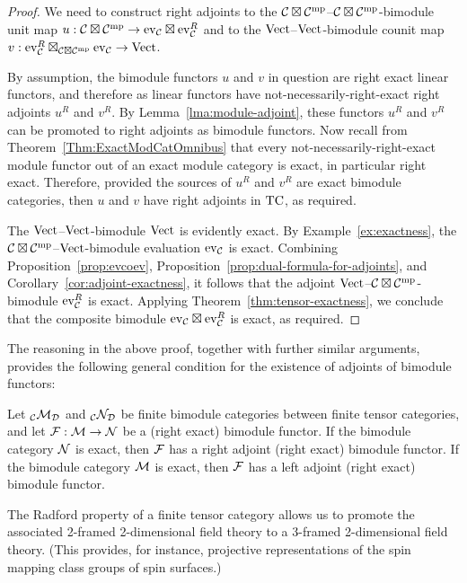 \documentclass{amsart}
\begin{document}
\begin{proof}
We need to construct right adjoints to the $\mathcal C \boxtimes \mathcal C^{\mathrm{mp}}$--$\mathcal C \boxtimes \mathcal C^{\mathrm{mp}}$-bimodule unit map $u: \mathcal C \boxtimes \mathcal C^{\mathrm{mp}} \rightarrow \mathrm{ev}_\mathcal C \boxtimes \mathrm{ev}_\mathcal C^R$ and to the $\mathrm{Vect}$--$\mathrm{Vect}$-bimodule counit map $v: \mathrm{ev}_\mathcal C^R \boxtimes_{\mathcal C \boxtimes \mathcal C^{\mathrm{mp}}} \mathrm{ev}_\mathcal C \rightarrow \mathrm{Vect}$.

By assumption, the bimodule functors $u$ and $v$ in question are right exact linear functors, and therefore as linear functors have not-necessarily-right-exact right adjoints $u^R$ and $v^R$.  By Lemma~\ref{lma:module-adjoint}, these functors $u^R$ and $v^R$ can be promoted to right adjoints as bimodule functors.  Now recall from Theorem~\ref{Thm:ExactModCatOmnibus} that every not-necessarily-right-exact module functor out of an exact module category is exact, in particular right exact.  Therefore, provided the sources of $u^R$ and $v^R$ are exact bimodule categories, then $u$ and $v$ have right adjoints in $\mathrm{TC}$, as required.

The $\mathrm{Vect}$--$\mathrm{Vect}$-bimodule $\mathrm{Vect}$ is evidently exact.  By Example~\ref{ex:exactness}, the $\mathcal C \boxtimes \mathcal C^{\mathrm{mp}}$--$\mathrm{Vect}$-bimodule evaluation $\mathrm{ev}_\mathcal C$ is exact.  Combining Proposition~\ref{prop:evcoev}, Proposition~\ref{prop:dual-formula-for-adjoints}, and Corollary~\ref{cor:adjoint-exactness}, it follows that the adjoint $\mathrm{Vect}$--$\mathcal C \boxtimes \mathcal C^{\mathrm{mp}}$-bimodule $\mathrm{ev}_\mathcal C^R$ is exact.  Applying Theorem~\ref{thm:tensor-exactness}, we conclude that the composite bimodule $\mathrm{ev}_\mathcal C \boxtimes \mathrm{ev}_\mathcal C^R$ is exact, as required.
\end{proof}

\nid The reasoning in the above proof, together with further similar arguments, provides the following general condition for the existence of adjoints of bimodule functors:
\begin{proposition}
Let ${}_\mathcal C \mathcal M_\mathcal D$ and ${}_\mathcal C \mathcal N_\mathcal D$ be finite bimodule categories between finite tensor categories, and let $\mathcal F : \mathcal M \rightarrow \mathcal N$ be a (right exact) bimodule functor.  If the bimodule category $\mathcal N$ is exact, then $\mathcal F$ has a right adjoint (right exact) bimodule functor.  If the bimodule category $\mathcal M$ is exact, then $\mathcal F$ has a left adjoint (right exact) bimodule functor.
\end{proposition}

The Radford property of a finite tensor category allows us to promote the associated 2-framed 2-dimensional field theory to a 3-framed 2-dimensional field theory.  (This provides, for instance, projective representations of the spin mapping class groups of spin surfaces.)
\end{document}
